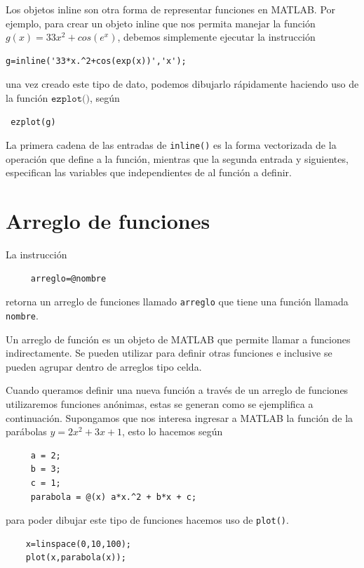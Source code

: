 \documentclass[11pt]{article}
\begin{document}
Los objetos inline son otra forma de representar funciones en MATLAB. Por ejemplo, para 
crear un objeto inline que nos permita manejar la funci\'on $g(x)=33x^2+cos(e^x)$, debemos simplemente 
ejecutar la instrucci\'on
\begin{verbatim}
g=inline('33*x.^2+cos(exp(x))','x');
\end{verbatim}
una vez creado este tipo de dato, podemos dibujarlo r\'apidamente haciendo uso de la funci\'on $\texttt{ezplot()}$, 
seg\'un
\begin{verbatim}
 ezplot(g)
\end{verbatim}
La primera cadena de las entradas de \texttt{inline()} es la forma vectorizada de la operaci\'on 
que define a la funci\'on, mientras que la segunda entrada y siguientes, especifican las variables 
que independientes de al funci\'on a definir.

\section{Arreglo de funciones}
  La instrucci\'on 
    \begin{verbatim}
     arreglo=@nombre
    \end{verbatim}
    retorna  un arreglo de funciones llamado \texttt{arreglo} que tiene 
    una funci\'on llamada \texttt{nombre}.
    
    Un arreglo de funci\'on es un objeto de MATLAB que permite llamar 
    a funciones indirectamente. Se pueden utilizar para definir otras funciones 
    e inclusive se pueden agrupar dentro de arreglos tipo celda.

    Cuando queramos definir una nueva funci\'on a trav\'es de un arreglo 
    de funciones utilizaremos funciones an\'onimas, estas se generan como 
    se ejemplifica a continuaci\'on. Supongamos que nos interesa ingresar a MATLAB
    la funci\'on de la par\'abolas $y=2x^2+3x+1$, esto lo hacemos seg\'un
    \begin{verbatim}
     a = 2;
     b = 3;
     c = 1;
     parabola = @(x) a*x.^2 + b*x + c;
    \end{verbatim}
    para poder dibujar este tipo de funciones hacemos uso de \texttt{plot()}.
    \begin{verbatim}
    x=linspace(0,10,100);
    plot(x,parabola(x));
    \end{verbatim}
    
\end{document}
